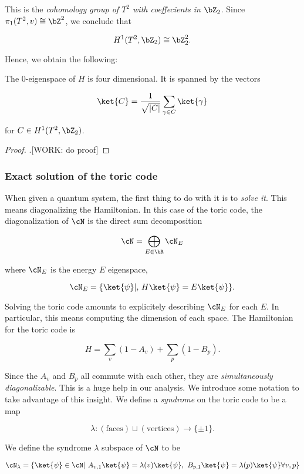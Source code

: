This is the \textit{cohomology group of $T^2$ with coeffecients in $\bZ_2$}. Since $\pi_1(T^2,v)\cong \bZ^2$, we conclude that

$$H^1(T^2,\bZ_2)\cong \bZ_2^2.$$

Hence, we obtain the following:

\begin{prop} The $0$-eigenspace of $H$ is four dimensional. It is spanned by the vectors

$$\ket{C}=\frac{1}{\sqrt{|C|}}\sum_{\gamma\in C}\ket{\gamma}$$

for $C\in H^1(T^2,\bZ_2)$.
\end{prop}
\begin{proof}.[WORK: do proof]
\end{proof}

\subsubsection{Exact solution of the toric code}

When given a quantum system, the first thing to do with it is to \textit{solve it}. This means diagonalizing the Hamiltonian. In this case of the toric code, the diagonalization of $\cN$ is the direct sum decomposition

$$\cN = \bigoplus_{E\in \bR}\cN_{E}$$

where $\cN_{E}$ is the energy $E$ eigenspace,

$$\cN_{E}=\{\ket{\psi} | ,\, H\ket{\psi}= E \ket{\psi}\}.$$

Solving the toric code amounts to explicitely describing $\cN_E$ for each $E$. In particular, this means computing the dimension of each space. The Hamiltonian for the toric code is 

$$H=\sum_{v}(1-A_v)+\sum_{p}(1-B_p).$$

Since the $A_v$ and $B_p$ all commute with each other, they are \textit{simultaneously diagonalizable}. This is a huge help in our analysis. We introduce some notation to take advantage of this insight. We define a \textit{syndrome} on the toric code to be a map

$$\lambda: (\text{faces})\sqcup (\text{vertices})\xrightarrow{}\{\pm 1\}.$$

We define the syndrome $\lambda$ subspace of $\cN$ to be

$$\cN_{\lambda}=\{\ket{\psi}\in \cN | \,\, A_{v,1}\ket{\psi}=\lambda(v)\ket{\psi},\,\, B_{p,1}\ket{\psi}=\lambda(p)\ket{\psi}    \forall v,p\}$$

